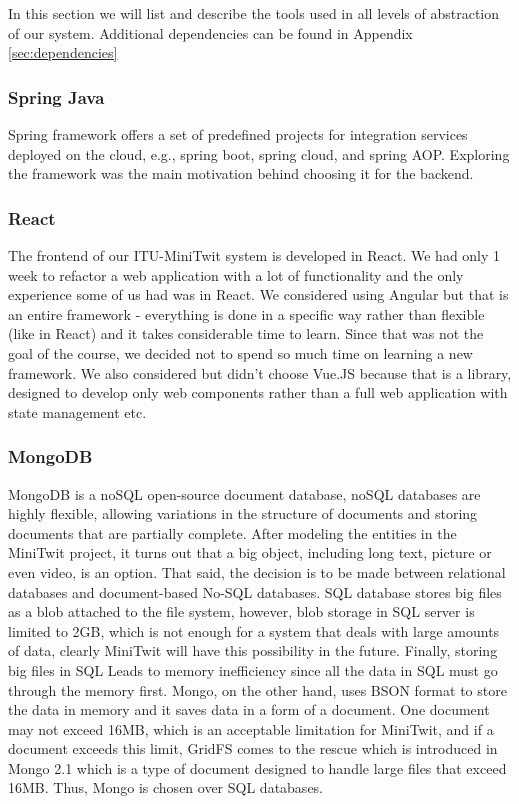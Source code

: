 In this section we will list and describe the tools used in all levels of abstraction of our system. Additional dependencies can be found in Appendix \ref{sec:dependencies}
\subsubsection{Spring Java}
Spring framework offers a set of predefined projects for integration services deployed on the cloud, e.g., spring boot, spring cloud, and spring AOP. Exploring the framework was the main motivation behind choosing it for the backend.
\newpage
\subsubsection{React}
The frontend of our ITU-MiniTwit system is developed in React. We had only 1 week to refactor a web application with a lot of functionality and the only experience some of us had was in React. We considered using Angular but that is an entire framework - everything is done in a specific way rather than flexible (like in React) and it takes considerable time to learn. Since that was not the goal of the course, we decided not to spend so much time on learning a new framework. We also considered but didn't choose Vue.JS because that is a library, designed to develop only web components rather than a full web application with state management etc. 

\subsubsection{MongoDB}
MongoDB is a noSQL open-source document database, noSQL databases are highly flexible, allowing variations in the structure of documents and storing documents that are partially complete. After modeling the entities in the MiniTwit project, it turns out that a big object, including long text, picture or even video, is an option. That said, the decision is to be made between relational databases and document-based No-SQL databases. SQL database stores big files as a blob attached to the file system, however, blob storage in SQL server is limited to 2GB, which is not enough for a system that deals with large amounts of data, clearly MiniTwit will have this possibility in the future. Finally, storing big files in SQL Leads to memory inefficiency since all the data in SQL must go through the memory first. Mongo, on the other hand, uses BSON format to store the data in memory and it saves data in a form of a document. One document may not exceed 16MB, which is an acceptable limitation for MiniTwit, and if a document exceeds this limit, GridFS comes to the rescue which is introduced in Mongo 2.1 which is a type of document designed to handle large files that exceed 16MB. Thus, Mongo is chosen over SQL databases.


